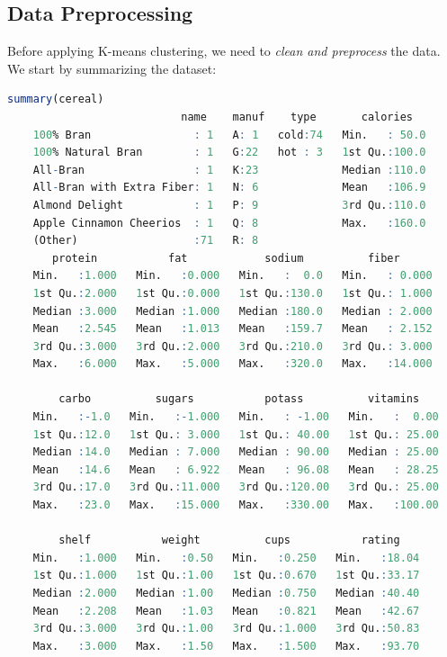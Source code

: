\documentclass[
]{book}
\theoremstyle{definition}
\theoremstyle{definition}
\theoremstyle{definition}
\theoremstyle{definition}
\theoremstyle{remark}
\begin{document}
\subsection{Data Preprocessing}\label{data-preprocessing}

Before applying K-means clustering, we need to \emph{clean and preprocess} the data. We start by summarizing the dataset:

\begin{lstlisting}[language=R]
summary(cereal)
                           name    manuf    type       calories    
    100% Bran                : 1   A: 1   cold:74   Min.   : 50.0  
    100% Natural Bran        : 1   G:22   hot : 3   1st Qu.:100.0  
    All-Bran                 : 1   K:23             Median :110.0  
    All-Bran with Extra Fiber: 1   N: 6             Mean   :106.9  
    Almond Delight           : 1   P: 9             3rd Qu.:110.0  
    Apple Cinnamon Cheerios  : 1   Q: 8             Max.   :160.0  
    (Other)                  :71   R: 8                            
       protein           fat            sodium          fiber       
    Min.   :1.000   Min.   :0.000   Min.   :  0.0   Min.   : 0.000  
    1st Qu.:2.000   1st Qu.:0.000   1st Qu.:130.0   1st Qu.: 1.000  
    Median :3.000   Median :1.000   Median :180.0   Median : 2.000  
    Mean   :2.545   Mean   :1.013   Mean   :159.7   Mean   : 2.152  
    3rd Qu.:3.000   3rd Qu.:2.000   3rd Qu.:210.0   3rd Qu.: 3.000  
    Max.   :6.000   Max.   :5.000   Max.   :320.0   Max.   :14.000  
                                                                    
        carbo          sugars           potass          vitamins     
    Min.   :-1.0   Min.   :-1.000   Min.   : -1.00   Min.   :  0.00  
    1st Qu.:12.0   1st Qu.: 3.000   1st Qu.: 40.00   1st Qu.: 25.00  
    Median :14.0   Median : 7.000   Median : 90.00   Median : 25.00  
    Mean   :14.6   Mean   : 6.922   Mean   : 96.08   Mean   : 28.25  
    3rd Qu.:17.0   3rd Qu.:11.000   3rd Qu.:120.00   3rd Qu.: 25.00  
    Max.   :23.0   Max.   :15.000   Max.   :330.00   Max.   :100.00  
                                                                     
        shelf           weight          cups           rating     
    Min.   :1.000   Min.   :0.50   Min.   :0.250   Min.   :18.04  
    1st Qu.:1.000   1st Qu.:1.00   1st Qu.:0.670   1st Qu.:33.17  
    Median :2.000   Median :1.00   Median :0.750   Median :40.40  
    Mean   :2.208   Mean   :1.03   Mean   :0.821   Mean   :42.67  
    3rd Qu.:3.000   3rd Qu.:1.00   3rd Qu.:1.000   3rd Qu.:50.83  
    Max.   :3.000   Max.   :1.50   Max.   :1.500   Max.   :93.70  
   
\end{lstlisting}
\end{document}
